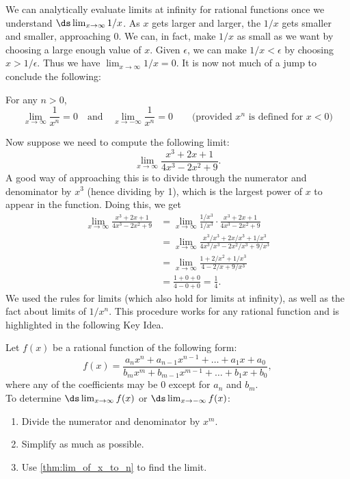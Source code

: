 We can analytically evaluate limits at infinity for rational functions once we understand $\ds\lim_{x\rightarrow\infty} 1/x$.  As $x$ gets larger and larger, the $1/x$ gets smaller and smaller, approaching 0.  We can, in fact, make $1/x$ as small as we want by choosing a large enough value of $x$.  Given $\epsilon$, we can make $1/x<\epsilon$  by choosing $x>1/\epsilon$.  Thus we have $\lim_{x\rightarrow\infty} 1/x=0$.  
It is now not much of a jump to conclude the following:

{
\begin{theorem}\label{thm:lim_of_x_to_n}
For any $n>0$, 
\[
\lim_{x\to\infty}\frac{1}{x^n}=0
\quad\text{and}\quad
\lim_{x\to-\infty}\frac{1}{x^n}=0
\qquad\text{(provided $x^n$ is defined for $x<0$)}
\]
\end{theorem}}


Now suppose we need to compute the following limit:
\[\lim_{x\rightarrow\infty}\frac{x^3+2x+1}{4x^3-2x^2+9}.\]
A good way of approaching this is to divide through the numerator and denominator by $x^3$ (hence dividing by 1), which is the largest power of $x$ to appear in the function.  Doing this, we get
\begin{align*}
\lim_{x\to\infty}\frac{x^3+2x+1}{4x^3-2x^2+9} &=
\lim_{x\to\infty}\frac{1/x^3}{1/x^3}\cdot\frac{x^3+2x+1}{4x^3-2x^2+9}\\ &=\lim_{x\to\infty}\frac{x^3/x^3+2x/x^3+1/x^3}{4x^3/x^3-2x^2/x^3+9/x^3}\\ &= \lim_{x\to\infty}\frac{1+2/x^2+1/x^3}{4-2/x+9/x^3}\\
&=\frac{1+0+0}{4-0+0}=\frac14.
\end{align*}
We used the rules for limits (which also hold for limits at infinity), as well as the fact about limits of $1/x^n$. This procedure works for any rational function and is highlighted in the following Key Idea.

\begin{keyidea}\label{key:rat_lim_at_inf}
Let $f(x)$ be a rational function of the following form:
\[
f(x)
=\frac{a_nx^n + a_{n-1}x^{n-1}+\dots + a_1x + a_0}
{b_mx^m + b_{m-1}x^{m-1} + \dots + b_1x + b_0},
\]
where any of the coefficients may be 0 except for $a_n$ and $b_m$.\\
To determine $\ds\lim_{x\to \infty}f(x)$ or $\ds\lim_{x\to-\infty}f(x)$:
\begin{enumerate}
\item Divide the numerator and denominator by $x^m$.
\item Simplify as much as possible.
\item Use \autoref{thm:lim_of_x_to_n} to find the limit.
\end{enumerate}
\end{keyidea}

